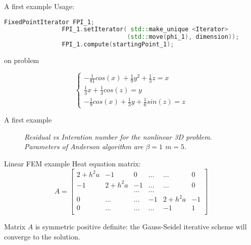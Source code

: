 \documentclass{beamer}
\begin{document}
				\begin{frame}[fragile]{A first example}
				Usage:
				
				
				\begin{lstlisting}[basicstyle=\scriptsize, language=C++]
				FixedPointIterator FPI_1;
				FPI_1.setIterator( std::make_unique <Iterator> 
				                  (std::move(phi_1), dimension));
				FPI_1.compute(startingPoint_1);
				\end{lstlisting}
				
				
				on problem
				
				\begin{equation*}
							\left \lbrace 
									\begin{aligned}
									-\frac{1}{81}cos(x) + \frac{1}{9}y^2 + \frac{1}{3}z = x\\
									\frac{1}{3}x + \frac{1}{3}cos(z) = y\\
									-\frac{1}{9}cos(x) + \frac{1}{3}y + \frac{1}{6}sin(z) = z 
								\end{aligned}
								\right.
				\end{equation*}

				\end{frame}


				\begin{frame}{A first example}			
				\begin{figure}
				{\scriptsize
				}
				\centering
				\caption{\textit{Residual vs Interation number for the nonlinear 3D problem.
				Parameters of Anderson algorithm are $\beta=1$ $m=5$.}}
				\end{figure}
			
				\end{frame}

				\begin{frame}{Linear FEM example}
				Heat equation matrix:
				\begin{equation*}
				A=\left[
				\begin{array}{llllll}
				2+h^2a & -1 & 0 &\ldots&\ldots& 0\\
				-1 & 2+h^2a & -1 &\ldots&\ldots& 0\\
				 &   & \ldots &\ldots& & \\
				0  & \ldots & \ldots &-1 &2+h^2a& -1\\
				0  & \ldots & \ldots &\ldots&-1& 1\\
				\end{array}
				\right]
				\end{equation*}

				Matrix $A$ is symmetric positive definite: the
				Gauss-Seidel iterative scheme will converge to the solution.
				\end{frame}
				
\end{document}
